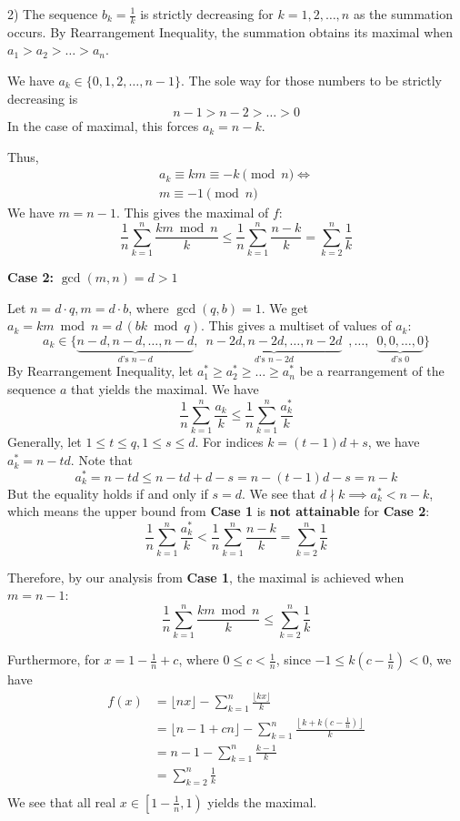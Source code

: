 \begin{enumerate}
 2) The sequence $b_k=\frac{1}{k}$ is strictly decreasing for $k=1,2,\ldots, n$ as the summation occurs. By Rearrangement Inequality, the summation obtains its maximal when $a_1>a_2>\ldots > a_n$. 

 We have $a_k\in\{0,1,2,\ldots, n-1\}$. The sole way for those numbers to be strictly decreasing is
 \[n-1>n-2>\ldots>0\]In the case of maximal, this forces $a_k=n-k$.

 Thus,\begin{gather*}a_k\equiv km\equiv -k\pmod{n}\iff\\m\equiv -1\pmod{n}\end{gather*}We have $m=n-1$. This gives the maximal of $f$:
 \[\frac{1}{n}\sum_{k=1}^{n}\frac{km\bmod{n}}{k}\le \frac{1}{n}\sum_{k=1}^{n}\frac{n-k}{k}=\sum_{k=2}^{n}\frac{1}{k}\]

 \textbf{Case 2: }$\gcd(m,n)=d>1$

 Let $n=d\cdot q, m=d\cdot b$, where $\gcd{(q,b)}=1$. We get $a_k=km\bmod{n}=d\, (bk\bmod{q})$. This gives a multiset of values of $a_k$:
 \[a_k\in\bigl\{\underbrace{n-d, n-d,\ldots, n-d}_{d\text{'s }n-d}, \enspace\underbrace{n-2d, n-2d,\ldots, n-2d}_{d\text{'s }n-2d}\enspace ,\ldots,\enspace \underbrace{0, 0,\ldots, 0}_{d\text{'s }0}\bigr\}\]By Rearrangement Inequality, let $a_1^*\ge a_2^*\ge \ldots \ge a_n^*$ be a rearrangement of the sequence $a$ that yields the maximal. We have
 \[\frac{1}{n}\sum_{k=1}^{n}\frac{a_k}{k}\le\frac{1}{n}\sum_{k=1}^{n}\frac{a_k^*}{k}\]Generally, let $1\le t\le q, 1\le s\le d$. For indices $k=(t-1)d+s$, we have $a_k^*=n-td$. Note that
 \[a_k^*=n-td\le n-td+d-s=n-(t-1)d-s=n-k\]But the equality holds if and only if $s=d$. We see that $d\nmid k\implies a_k^* < n-k$, which means the upper bound from \textbf{Case 1} is \textbf{not attainable} for \textbf{Case 2}:
 \[\frac{1}{n}\sum_{k=1}^{n}\frac{a_k^*}{k} < \frac{1}{n}\sum_{k=1}^{n}\frac{n-k}{k}=\sum_{k=2}^{n}\frac{1}{k}\]

 Therefore, by our analysis from \textbf{Case 1}, the maximal is achieved when $m=n-1$:
 \[\frac{1}{n}\sum_{k=1}^{n}\frac{km\bmod{n}}{k}\le\sum_{k=2}^{n}\frac{1}{k}\]

 Furthermore, for $x=1-\frac{1}{n}+c$, where $0\le c < \frac{1}{n}$, since $-1\le k\left(c-\frac{1}{n}\right)<0$, we have\begin{align*}f(x)&=\lfloor nx\rfloor -\sum_{k=1}^{n}\frac{\lfloor kx\rfloor}{k}\\&=\lfloor n-1+cn\rfloor-\sum_{k=1}^{n}\frac{\left\lfloor k+k\left(c-\frac{1}{n}\right)\right\rfloor}{k}\\&=n-1-\sum_{k=1}^{n}\frac{k-1}{k}\\&=\sum_{k=2}^{n}\frac{1}{k}\\\end{align*}
We see that all real $x\in \left[1-\frac{1}{n}, 1\right)$ yields the maximal.


\end{enumerate}
